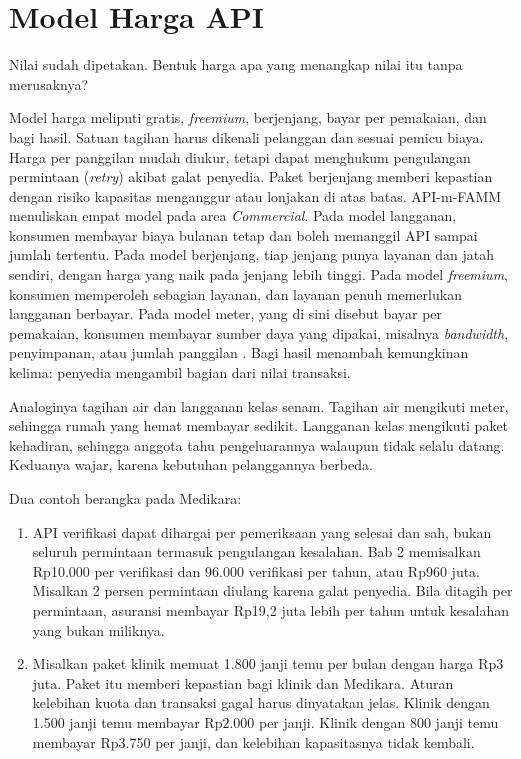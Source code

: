 \section{Model Harga API}

Nilai sudah dipetakan. Bentuk harga apa yang menangkap nilai itu tanpa merusaknya?

Model harga meliputi gratis, \textit{freemium}, berjenjang, bayar per pemakaian, dan bagi hasil. Satuan tagihan harus dikenali
pelanggan dan sesuai pemicu biaya. Harga per panggilan mudah diukur, tetapi dapat menghukum pengulangan permintaan (\textit{retry})
akibat galat penyedia. Paket berjenjang memberi kepastian dengan risiko kapasitas menganggur atau lonjakan di atas batas.
API-m-FAMM menuliskan empat model pada area \textit{Commercial}. Pada model langganan, konsumen membayar biaya bulanan tetap dan
boleh memanggil API sampai jumlah tertentu. Pada model berjenjang, tiap jenjang punya layanan dan jatah sendiri, dengan harga
yang naik pada jenjang lebih tinggi. Pada model \textit{freemium}, konsumen memperoleh sebagian layanan, dan layanan penuh
memerlukan langganan berbayar. Pada model meter, yang di sini disebut bayar per pemakaian, konsumen membayar sumber daya yang dipakai, misalnya \textit{bandwidth},
penyimpanan, atau jumlah panggilan \cite{mathijssen2020}. Bagi hasil menambah kemungkinan kelima: penyedia mengambil bagian
dari nilai transaksi.

Analoginya tagihan air dan langganan kelas senam. Tagihan air mengikuti meter, sehingga rumah yang hemat membayar sedikit.
Langganan kelas mengikuti paket kehadiran, sehingga anggota tahu pengeluarannya walaupun tidak selalu datang. Keduanya wajar,
karena kebutuhan pelanggannya berbeda.

Dua contoh berangka pada Medikara:
\begin{enumerate}
  \item API verifikasi dapat dihargai per pemeriksaan yang selesai dan sah, bukan seluruh permintaan termasuk pengulangan
        kesalahan. Bab 2 memisalkan Rp10.000 per verifikasi dan 96.000 verifikasi per tahun, atau Rp960 juta. Misalkan 2 persen
        permintaan diulang karena galat penyedia. Bila ditagih per permintaan, asuransi membayar Rp19,2 juta lebih per tahun
        untuk kesalahan yang bukan miliknya.
  \item Misalkan paket klinik memuat 1.800 janji temu per bulan dengan harga Rp3 juta. Paket itu memberi kepastian bagi klinik dan
        Medikara. Aturan kelebihan kuota dan transaksi gagal harus dinyatakan jelas. Klinik dengan 1.500 janji temu membayar
        Rp2.000 per janji. Klinik dengan 800 janji temu membayar Rp3.750 per janji, dan kelebihan kapasitasnya tidak kembali.
\end{enumerate}

